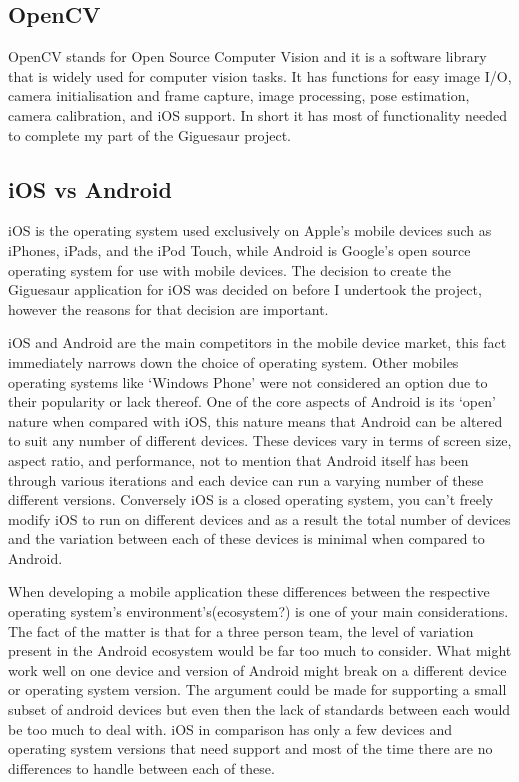 \documentclass{article}
\begin{document}
\subsection{OpenCV}

OpenCV stands for Open Source Computer Vision and it is a software library that is widely used for computer vision tasks. It has functions for easy image I/O, camera initialisation and frame capture, image processing, pose estimation, camera calibration, and iOS support. In short it has most of functionality needed to complete my part of the Giguesaur project.

\subsection{iOS vs Android}

iOS is the operating system used exclusively on Apple's mobile devices such as iPhones, iPads, and the iPod Touch, while Android is Google's open source operating system for use with mobile devices. The decision to create the Giguesaur application for iOS was decided on before I undertook the project, however the reasons for that decision are important. 

iOS and Android are the main competitors in the mobile device market, this fact immediately narrows down the choice of operating system. Other mobiles operating systems like `Windows Phone' were not considered an option due to their popularity or lack thereof. One of the core aspects of Android is its `open' nature when compared with iOS, this nature means that Android can be altered to suit any number of different devices. These devices vary in terms of screen size, aspect ratio, and performance, not to mention that Android itself has been through various iterations and each device can run a varying number of these different versions. Conversely iOS is a closed operating system, you can't freely modify iOS to run on different devices and as a result the total number of devices and the variation between each of these devices is minimal when compared to Android. 

When developing a mobile application these differences between the respective operating system's environment's(ecosystem?) is one of your main considerations. The fact of the matter is that for a three person team, the level of variation present in the Android ecosystem would be far too much to consider. What might work well on one device and version of Android might break on a different device or operating system version. The argument could be made for supporting a small subset of android devices but even then the lack of standards between each would be too much to deal with. iOS in comparison has only a few devices and operating system versions that need support and most of the time there are no differences to handle between each of these. 
\end{document}
